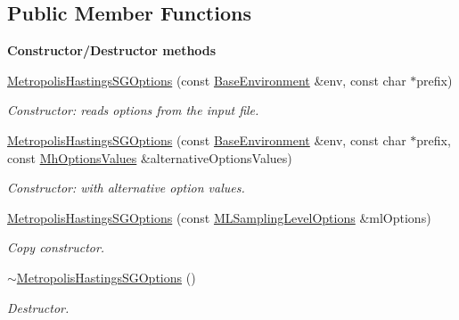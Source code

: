 \subsection*{Public Member Functions}
\begin{Indent}{\bf Constructor/\-Destructor methods}\par
\begin{DoxyCompactItemize}
\item 
\hyperlink{class_q_u_e_s_o_1_1_metropolis_hastings_s_g_options_a3d26a0f1ac5fa1cbe835abd62d1504d3}{Metropolis\-Hastings\-S\-G\-Options} (const \hyperlink{class_q_u_e_s_o_1_1_base_environment}{Base\-Environment} \&env, const char $\ast$prefix)
\begin{DoxyCompactList}\small\item\em Constructor\-: reads options from the input file. \end{DoxyCompactList}\item 
\hyperlink{class_q_u_e_s_o_1_1_metropolis_hastings_s_g_options_a8dd35851b71b45a8ab47a3916eefa5fc}{Metropolis\-Hastings\-S\-G\-Options} (const \hyperlink{class_q_u_e_s_o_1_1_base_environment}{Base\-Environment} \&env, const char $\ast$prefix, const \hyperlink{class_q_u_e_s_o_1_1_mh_options_values}{Mh\-Options\-Values} \&alternative\-Options\-Values)
\begin{DoxyCompactList}\small\item\em Constructor\-: with alternative option values. \end{DoxyCompactList}\item 
\hyperlink{class_q_u_e_s_o_1_1_metropolis_hastings_s_g_options_ad76c11cfeb4c903887eaf752b5bb0b92}{Metropolis\-Hastings\-S\-G\-Options} (const \hyperlink{class_q_u_e_s_o_1_1_m_l_sampling_level_options}{M\-L\-Sampling\-Level\-Options} \&ml\-Options)
\begin{DoxyCompactList}\small\item\em Copy constructor. \end{DoxyCompactList}\item 
\hyperlink{class_q_u_e_s_o_1_1_metropolis_hastings_s_g_options_a5c914963bff6168e3b480643adb4362c}{$\sim$\-Metropolis\-Hastings\-S\-G\-Options} ()
\begin{DoxyCompactList}\small\item\em Destructor. \end{DoxyCompactList}\end{DoxyCompactItemize}
\end{Indent}
